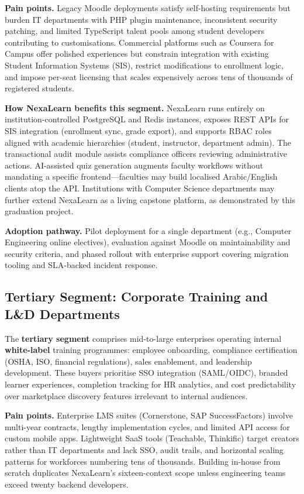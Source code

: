 \textbf{Pain points.} Legacy Moodle deployments satisfy self-hosting requirements but burden IT departments with PHP plugin maintenance, inconsistent security patching, and limited TypeScript talent pools among student developers contributing to customisations. Commercial platforms such as Coursera for Campus offer polished experiences but constrain integration with existing Student Information Systems (SIS), restrict modifications to enrollment logic, and impose per-seat licensing that scales expensively across tens of thousands of registered students.

\textbf{How NexaLearn benefits this segment.} NexaLearn runs entirely on institution-controlled PostgreSQL and Redis instances, exposes REST APIs for SIS integration (enrollment sync, grade export), and supports RBAC roles aligned with academic hierarchies (student, instructor, department admin). The transactional audit module assists compliance officers reviewing administrative actions. AI-assisted quiz generation augments faculty workflows without mandating a specific frontend---faculties may build localised Arabic/English clients atop the API. Institutions with Computer Science departments may further extend NexaLearn as a living capstone platform, as demonstrated by this graduation project.

\textbf{Adoption pathway.} Pilot deployment for a single department (e.g., Computer Engineering online electives), evaluation against Moodle on maintainability and security criteria, and phased rollout with enterprise support covering migration tooling and SLA-backed incident response.

\subsection{Tertiary Segment: Corporate Training and L\&D Departments}
\label{subsec:tertiary-corporate}

The \textbf{tertiary segment} comprises mid-to-large enterprises operating internal \textbf{white-label} training programmes: employee onboarding, compliance certification (OSHA, ISO, financial regulations), sales enablement, and leadership development. These buyers prioritise SSO integration (SAML/OIDC), branded learner experiences, completion tracking for HR analytics, and cost predictability over marketplace discovery features irrelevant to internal audiences.

\textbf{Pain points.} Enterprise LMS suites (Cornerstone, SAP SuccessFactors) involve multi-year contracts, lengthy implementation cycles, and limited API access for custom mobile apps. Lightweight SaaS tools (Teachable, Thinkific) target creators rather than IT departments and lack SSO, audit trails, and horizontal scaling patterns for workforces numbering tens of thousands. Building in-house from scratch duplicates NexaLearn's sixteen-context scope unless engineering teams exceed twenty backend developers.

